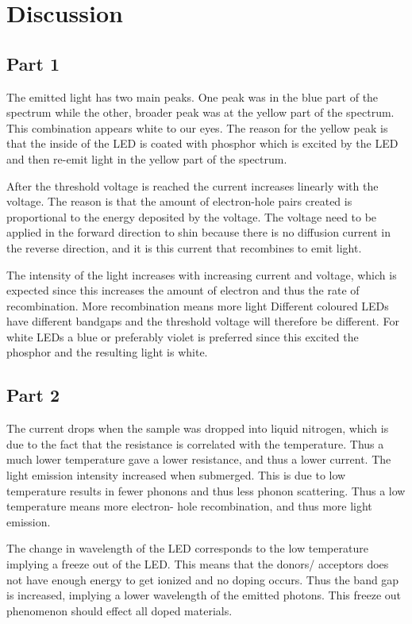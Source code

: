 \newpage
\section{Discussion}
\subsection{Part 1}
The emitted light has two main peaks. One peak was in the blue part of the spectrum while the other, broader peak was at the yellow part of the spectrum. This combination appears white to our eyes. The reason for the yellow peak is that the inside of the LED is coated with phosphor which is excited by the LED and then re-emit light in the yellow part of the spectrum.

After the threshold voltage is reached the current increases linearly with the voltage. The reason is that the amount of electron-hole pairs created is proportional to the energy deposited by the voltage. The voltage need to be applied in the forward direction to shin because there is no diffusion current in the reverse direction, and it is this current that recombines to emit light.

The intensity of the light increases with increasing current and voltage, which is expected since this increases the amount of electron and thus the rate of recombination. More recombination means more light Different coloured LEDs have different bandgaps and the threshold voltage will therefore be different. For white LEDs a blue or preferably violet is preferred since this excited the phosphor and the resulting light is white.

\subsection{Part 2}
The current drops when the sample was dropped into liquid nitrogen, which is due to the fact that the resistance is correlated with the temperature. Thus a much lower temperature gave a lower resistance, and thus a lower current. The light emission intensity increased when submerged. This is due to low temperature results in fewer phonons and thus less phonon scattering. Thus a low temperature means more electron- hole recombination, and thus more light emission. 

The change in wavelength of the LED corresponds to the low temperature implying a freeze out of the LED. This means that the donors/ acceptors does not have enough energy to get ionized and no doping occurs. Thus the band gap is increased, implying a lower wavelength of the emitted photons. This freeze out phenomenon should effect all doped materials. 


